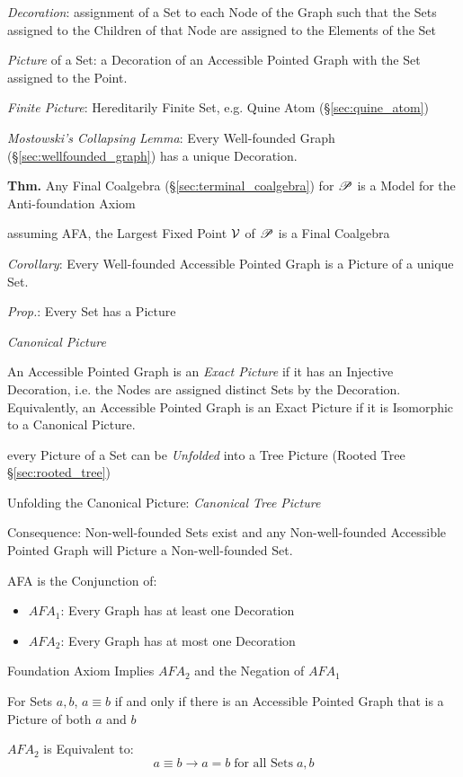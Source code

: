 \emph{Decoration}: assignment of a Set to each Node of the Graph such
that the Sets assigned to the Children of that Node are assigned to
the Elements of the Set

\emph{Picture} of a Set: a Decoration of an Accessible Pointed Graph
with the Set assigned to the Point.

\emph{Finite Picture}: Hereditarily Finite Set, e.g. Quine Atom
(\S\ref{sec:quine_atom})

\emph{Mostowski's Collapsing Lemma}: Every Well-founded Graph
(\S\ref{sec:wellfounded_graph}) has a unique Decoration.

\textbf{Thm.} Any Final Coalgebra (\S\ref{sec:terminal_coalgebra}) for
$\mathscr{P}$ is a Model for the Anti-foundation Axiom

assuming AFA, the Largest Fixed Point $\mathcal{V}$ of $\mathscr{P}$ is a Final
Coalgebra

\emph{Corollary}: Every Well-founded Accessible Pointed Graph is a
Picture of a unique Set.

\emph{Prop.}: Every Set has a Picture

\emph{Canonical Picture}

An Accessible Pointed Graph is an \emph{Exact Picture} if it has an
Injective Decoration, i.e. the Nodes are assigned distinct Sets by the
Decoration. Equivalently, an Accessible Pointed Graph is an Exact
Picture if it is Isomorphic to a Canonical Picture.

every Picture of a Set can be \emph{Unfolded} into a Tree Picture
(Rooted Tree \S\ref{sec:rooted_tree})

Unfolding the Canonical Picture: \emph{Canonical Tree Picture}

Consequence: Non-well-founded Sets exist and any Non-well-founded
Accessible Pointed Graph will Picture a Non-well-founded Set.

AFA is the Conjunction of:
\begin{itemize}
  \item $AFA_1$: Every Graph has at least one Decoration
  \item $AFA_2$: Every Graph has at most one Decoration
\end{itemize}

Foundation Axiom Implies $AFA_2$ and the Negation of $AFA_1$

For Sets $a,b$, $a \equiv b$ if and only if there is an Accessible
Pointed Graph that is a Picture of both $a$ and $b$

$AFA_2$ is Equivalent to:
\[
  a \equiv b \to a = b \;\text{for all Sets}\; a,b
\]

